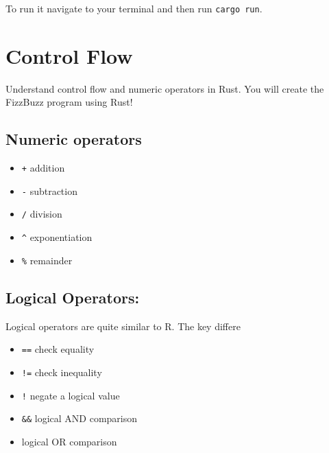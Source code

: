 \documentclass[
  letterpaper,
  DIV=11,
  numbers=noendperiod,
  oneside]{scrreprt}
\providecommand{\tightlist}{%
  \setlength{\itemsep}{0pt}\setlength{\parskip}{0pt}}\usepackage{longtable,booktabs,array}
\begin{document}
To run it navigate to your terminal and then run \texttt{cargo\ run}.

\chapter{Control Flow}\label{control-flow}

\begin{tcolorbox}[enhanced jigsaw, titlerule=0mm, coltitle=black, opacitybacktitle=0.6, bottomrule=.15mm, bottomtitle=1mm, colframe=quarto-callout-tip-color-frame, toprule=.15mm, opacityback=0, rightrule=.15mm, leftrule=.75mm, breakable, left=2mm, colback=white, colbacktitle=quarto-callout-tip-color!10!white, toptitle=1mm, title=\textcolor{quarto-callout-tip-color}{\faLightbulb}\hspace{0.5em}{Objective}, arc=.35mm]

Understand control flow and numeric operators in Rust. You will create
the FizzBuzz program using Rust!

\end{tcolorbox}

\section{Numeric operators}\label{numeric-operators}

\begin{itemize}
\tightlist
\item
  \texttt{+} addition
\item
  \texttt{-} subtraction
\item
  \texttt{/} division
\item
  \texttt{\^{}} exponentiation
\item
  \texttt{\%} remainder
\end{itemize}

\section{Logical Operators:}\label{logical-operators}

Logical operators are quite similar to R. The key differe

\begin{itemize}
\tightlist
\item
  \texttt{==} check equality
\item
  \texttt{!=} check inequality
\item
  \texttt{!} negate a logical value
\item
  \texttt{\&\&} logical AND comparison
\item
  \texttt{\textbar{}\textbar{}} logical OR comparison
\end{itemize}
\end{document}
